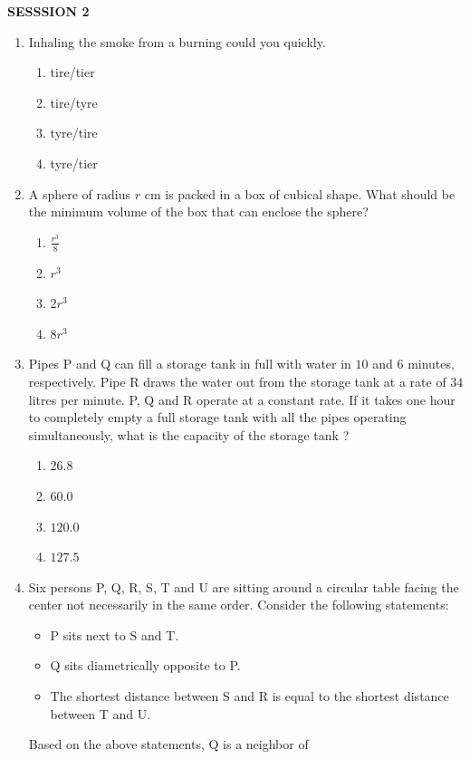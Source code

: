 \documentclass[journal]{IEEEtran}
\begin{document}
\vspace{1cm}
\textbf{SESSSION 2}
\begin{enumerate}
\item Inhaling the smoke from a burning \underline{\hspace{2cm}} could \underline{\hspace{2cm}} you quickly.

\hfill{}
\begin{enumerate}
\item tire/tier
\item tire/tyre
\item tyre/tire
\item tyre/tier
\end{enumerate}

\item A sphere of radius $r$ cm is packed in a box of cubical shape. What should be the minimum volume  of the box that can enclose the sphere?

\hfill{}
\begin{enumerate}
\item $\frac{r^3}{8}$
\item $r^3$
\item $2r^3$
\item $8r^3$
\end{enumerate}

\item Pipes P and Q can fill a storage tank in full with water in $10$ and $6$ minutes, respectively. Pipe R draws the water out from the storage tank at a rate of $34$ litres per minute. P, Q and R operate at a constant rate. If it takes one hour to completely empty a full storage tank with all the pipes operating simultaneously, what is the capacity of the storage tank ?

\hfill{}
\begin{enumerate}
\item $26.8$
\item $60.0$
\item $120.0$
\item $127.5$
\end{enumerate}

\item Six persons P, Q, R, S, T and U are sitting around a circular table facing the center not necessarily in the same order. Consider the following statements:
\begin{itemize}
\item P sits next to S and T.
\item Q sits diametrically opposite to P.
\item The shortest distance between S and R is equal to the shortest distance between T and U.
\end{itemize}
Based on the above statements, Q is a neighbor of


\end{enumerate}
\end{document}
